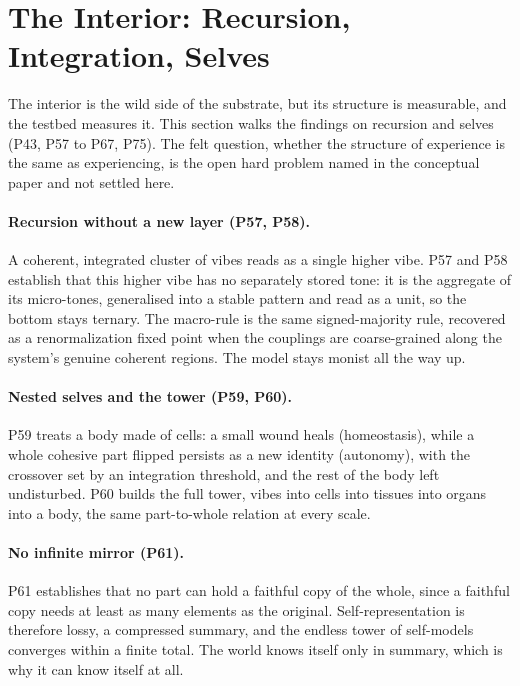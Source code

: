 \section{The Interior: Recursion, Integration, Selves}
\label{sec:interior}

The interior is the wild side of the substrate, but its structure is measurable, and the testbed
measures it. This section walks the findings on recursion and selves (P43, P57 to P67, P75). The
felt question, whether the structure of experience is the same as experiencing, is the open hard
problem named in the conceptual paper and not settled here.

\paragraph{Recursion without a new layer (P57, P58).}
A coherent, integrated cluster of vibes reads as a single higher vibe. P57 and P58 establish that
this higher vibe has no separately stored tone: it is the aggregate of its micro-tones, generalised
into a stable pattern and read as a unit, so the bottom stays ternary. The macro-rule is the same
signed-majority rule, recovered as a renormalization fixed point when the couplings are coarse-grained
along the system's genuine coherent regions. The model stays monist all the way up.

\paragraph{Nested selves and the tower (P59, P60).}
P59 treats a body made of cells: a small wound heals (homeostasis), while a whole cohesive part
flipped persists as a new identity (autonomy), with the crossover set by an integration threshold,
and the rest of the body left undisturbed. P60 builds the full tower, vibes into cells into tissues
into organs into a body, the same part-to-whole relation at every scale.

\paragraph{No infinite mirror (P61).}
P61 establishes that no part can hold a faithful copy of the whole, since a faithful copy needs at
least as many elements as the original. Self-representation is therefore lossy, a compressed summary,
and the endless tower of self-models converges within a finite total. The world knows itself only in
summary, which is why it can know itself at all.

